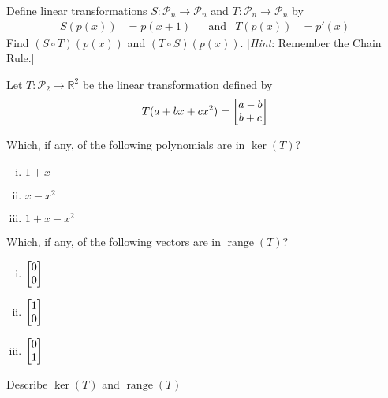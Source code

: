 \documentclass[boxes]{gsypset}
\DeclareMathOperator{\range}{range}
\begin{document}
	\begin{problem}[6.4.27]
		Define linear transformations $S: \mathscr{P}_n \to \mathscr{P}_n$ and
		$T: \mathscr{P}_n \to \mathscr{P}_n$ by
		\begin{align*}
			S(p(x)) &= p(x+1) &
			&\text{and}&
			T(p(x)) &= p'(x)
		\end{align*}
		Find $(S \circ T)(p(x))$ and $(T \circ S)(p(x))$.
		[\textit{Hint}: Remember the Chain Rule.]
	\end{problem}
	\begin{solution}
		
	\end{solution}
	
	\begin{problem}[6.5.3]
		Let $T: \mathscr{P}_2 \to \mathbb{R}^2$ be the linear transformation defined by
		\[
			T(a + bx + cx^2) = \begin{bmatrix}a-b\\b+c\end{bmatrix}
		\]
		\begin{subproblems}[(a)]
			\subproblem Which, if any, of the following polynomials are in $\ker(T)$?
				\begin{solution}
					\begin{enumerate}[(i)]
						\item $1+x$
						\item $x-x^2$
						\item $1+x-x^2$
					\end{enumerate}
				\end{solution}
			\subproblem Which, if any, of the following vectors are in $\range(T)$?
				\begin{solution}
					\begin{enumerate}[(i)]
						\item $\begin{bmatrix}0\\0\end{bmatrix}$
						\item $\begin{bmatrix}1\\0\end{bmatrix}$
						\item $\begin{bmatrix}0\\1\end{bmatrix}$
					\end{enumerate}
				\end{solution}
			\subproblem Describe $\ker(T)$ and $\range(T)$
			\begin{solution}
				
			\end{solution}
		\end{subproblems}
	\end{problem}
	\begin{solution}
		
	\end{solution}
	
\end{document}
